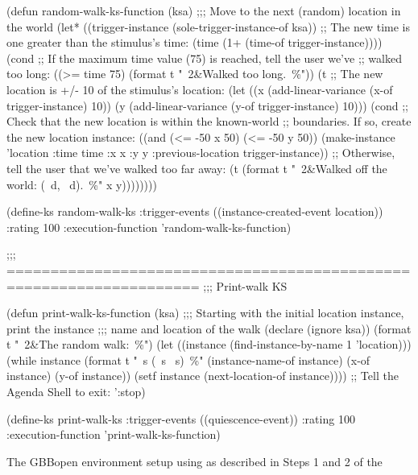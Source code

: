 \documentclass[10pt,twoside,english,pdftex]{article}
\begin{document}
\begin{tightitemize}
\begin{example}
  (defun random-walk-ks-function (ksa)
    ;;; Move to the next (random) location in the world
    (let* ((trigger-instance (sole-trigger-instance-of ksa))
           ;; The new time is one greater than the stimulus's time:
           (time (1+ (time-of trigger-instance))))
      (cond
       ;; If the maximum time value (75) is reached, tell the user we've
       ;; walked too long:
       ((>= time 75) (format t "~2&Walked too long.~\%"))
       (t ;; The new location is +/- 10 of the stimulus's location:
        (let ((x (add-linear-variance (x-of trigger-instance) 10))
              (y (add-linear-variance (y-of trigger-instance) 10)))
          (cond
           ;; Check that the new location is within the known-world
           ;; boundaries.  If so, create the new location instance:
           ((and (<= -50 x 50) (<= -50 y 50))
            (make-instance 'location 
              :time time 
              :x x 
              :y y
              :previous-location trigger-instance))
           ;; Otherwise, tell the user that we've walked too far away:
           (t (format t "~2\&Walked off the world: (~d, ~d).~\%" x y))))))))

  (define-ks random-walk-ks
      :trigger-events ((instance-created-event location))
      :rating 100
      :execution-function 'random-walk-ks-function)

  ;;; ====================================================================
  ;;;   Print-walk KS

  (defun print-walk-ks-function (ksa)
    ;;; Starting with the initial location instance, print the instance
    ;;; name and location of the walk
    (declare (ignore ksa))
    (format t "~2\&The random walk:~\%")
    (let ((instance (find-instance-by-name 1 'location)))
      (while instance
        (format t "~s (~s ~s)~\%"
                (instance-name-of instance)
                (x-of instance)
                (y-of instance))
        (setf instance (next-location-of instance))))
    ;; Tell the Agenda Shell to exit:
    ':stop)

  (define-ks print-walk-ks
    :trigger-events ((quiescence-event))
    :rating 100
    :execution-function 'print-walk-ks-function)
\end{example}

\item The GBBopen environment setup using
   as described in Steps 1
  and 2 of the 
\end{tightitemize}
\end{document}
